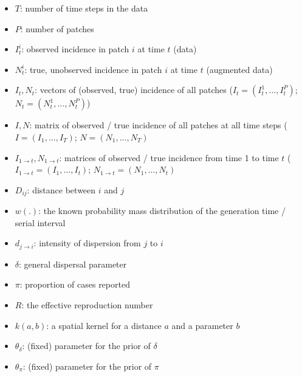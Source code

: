 \documentclass[a4paper,11pt]{article}
\newcommand{\R}{\mathbb{R}}
\begin{document}
\begin{itemize}
 \item $T$: number of time steps in the data
 \item $P$: number of patches
 \item $I_t^i$: observed incidence in patch $i$ at time $t$ (data)
 \item $N_t^i$: true, unobserved incidence in patch $i$ at time $t$ (augmented 
data)
 \item $I_t, N_t$: vectors of (observed, true) incidence of all patches 
 ($I_t = (I_t^1, \ldots, I_t^P)$; $N_t = (N_t^1, \ldots, N_t^P)$)
 \item $I,N$: matrix of observed / true incidence of all patches at all time 
steps ($I = (I_1, \ldots, I_T)$; $N = (N_1, \ldots, N_T)$
 \item $I_{1 \rightarrow t}, N_{1 \rightarrow t}$: matrices of observed / true 
incidence from time 1 to time $t$ 
($I_{1 \rightarrow t} = (I_1, \ldots, I_t)$; $N_{1 \rightarrow t} = (N_1, 
\ldots, N_t)$
 \item $D_{ij}$: distance between $i$ and $j$
 \item $w(.)$: the known probability mass distribution of the generation time / serial interval
 \item $d_{j\rightarrow i}$: intensity of dispersion from $j$ to $i$
 \item $\delta$: general dispersal parameter
 \item $\pi$: proportion of cases reported
 \item $R$: the effective reproduction 
number
 \item $k(a,b)$: a spatial kernel for a distance $a$ and a parameter $b$
 \item $\theta_{\delta}$: (fixed) parameter for the prior of 
$\delta$
 \item $\theta_{\pi}$: (fixed) parameter for the prior of $\pi$
\end{itemize}
\end{document}
